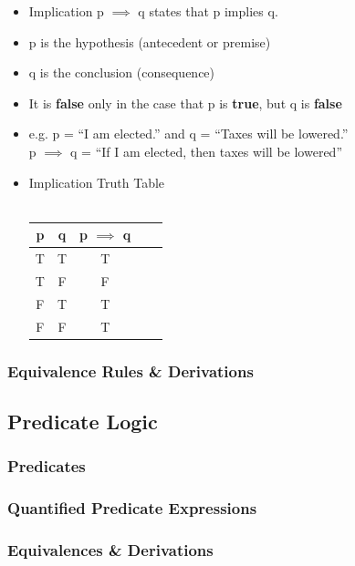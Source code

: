 \documentclass[english, 11pt]{article}
\begin{document}
\begin{addmargin}[2em]{2em}
\begin{itemize}
        \begin{itemize}
          \item Implication p $\implies$ q states that p implies q.
          \item p is the hypothesis (antecedent or premise)
          \item q is the conclusion (consequence)
          \item It is \textbf{false} only in the case that p is \textbf{true}, but q is \textbf{false}
          \item e.g. p = ``I am elected.'' and q = ``Taxes will be lowered.''
          \\
          p $\implies$ q = ``If I am elected, then taxes will be lowered''
          \item Implication Truth Table
          \\
          \\
          \begin{tabular}{cc|ccc}
            p & q & p  $\implies$  q \\
            \hline
            T & T & T  \\
            T & F & F  \\
            F & T & T  \\
            F & F & T
          \end{tabular}

        \end{itemize}

    \end{itemize}

  \subsubsection{Equivalence Rules \& Derivations}


\end{addmargin}
\subsection{Predicate Logic}
\subsubsection{Predicates}
\subsubsection{Quantified Predicate Expressions}
\subsubsection{Equivalences \& Derivations}











  
\end{document}

